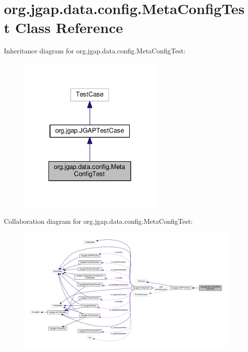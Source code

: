 \hypertarget{classorg_1_1jgap_1_1data_1_1config_1_1_meta_config_test}{\section{org.\-jgap.\-data.\-config.\-Meta\-Config\-Test Class Reference}
\label{classorg_1_1jgap_1_1data_1_1config_1_1_meta_config_test}
}


Inheritance diagram for org.\-jgap.\-data.\-config.\-Meta\-Config\-Test\-:
\nopagebreak
\begin{figure}[H]
\begin{center}
\leavevmode
\includegraphics[width=206pt]{classorg_1_1jgap_1_1data_1_1config_1_1_meta_config_test__inherit__graph}
\end{center}
\end{figure}


Collaboration diagram for org.\-jgap.\-data.\-config.\-Meta\-Config\-Test\-:
\nopagebreak
\begin{figure}[H]
\begin{center}
\leavevmode
\includegraphics[width=350pt]{classorg_1_1jgap_1_1data_1_1config_1_1_meta_config_test__coll__graph}
\end{center}
\end{figure}
